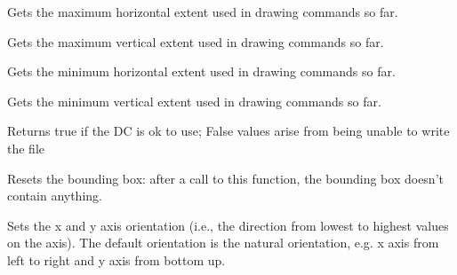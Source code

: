 \label{wxsvgfiledcmaxx}


Gets the maximum horizontal extent used in drawing commands so far.

\label{wxsvgfiledcmaxy}


Gets the maximum vertical extent used in drawing commands so far.

\label{wxsvgfiledcminx}


Gets the minimum horizontal extent used in drawing commands so far.

\label{wxsvgfiledcminy}


Gets the minimum vertical extent used in drawing commands so far.

\label{wxsvgfiledcok}


Returns true if the DC is ok to use; False values arise from being unable to 
write the file

\label{wxsvgfiledcresetboundingbox}


Resets the bounding box: after a call to this function, the bounding box
doesn't contain anything.



\label{wxsvgfiledcsetaxisorientation}


Sets the x and y axis orientation (i.e., the direction from lowest to
highest values on the axis). The default orientation is the natural
orientation, e.g. x axis from left to right and y axis from bottom up.



